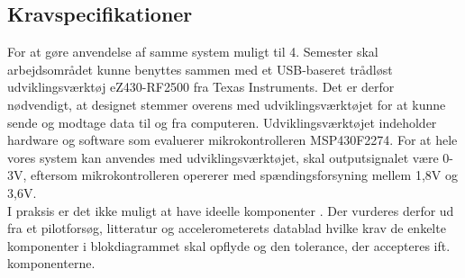\subsection{Kravspecifikationer}
For at gøre anvendelse af samme system muligt til 4. Semester skal arbejdsområdet kunne benyttes sammen med et USB-baseret trådløst udviklingsværktøj eZ430-RF2500 fra Texas Instruments. Det er derfor nødvendigt, at designet stemmer overens med udviklingsværktøjet for at kunne sende og modtage data til og fra computeren. Udviklingsværktøjet indeholder hardware og software som evaluerer mikrokontrolleren MSP430F2274. For at hele vores system kan anvendes med udviklingsværktøjet, skal outputsignalet være 0-3V, eftersom mikrokontrolleren opererer med spændingsforsyning mellem 1,8V og 3,6V. \\
I praksis er det ikke muligt at have ideelle komponenter . Der vurderes derfor ud fra et pilotforsøg, litteratur og accelerometerets datablad hvilke krav de enkelte komponenter i blokdiagrammet skal opflyde og den tolerance, der accepteres ift. komponenterne. 


